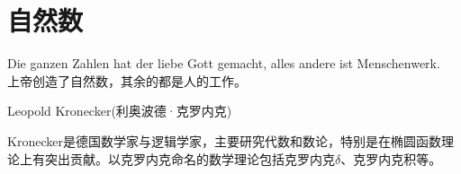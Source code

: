 
\chapter{自然数}
\label{chap:number}

\epigraph{Die ganzen Zahlen hat der liebe Gott gemacht, alles andere ist Menschenwerk.\\
  上帝创造了自然数，其余的都是人的工作。}{Leopold Kronecker(利奥波德·克罗内克)}

Kronecker是德国数学家与逻辑学家，主要研究代数和数论，特别是在椭圆函数理论上有突出贡献。以克罗内克命名的数学理论包括克罗内克$\delta$、克罗内克积等。
